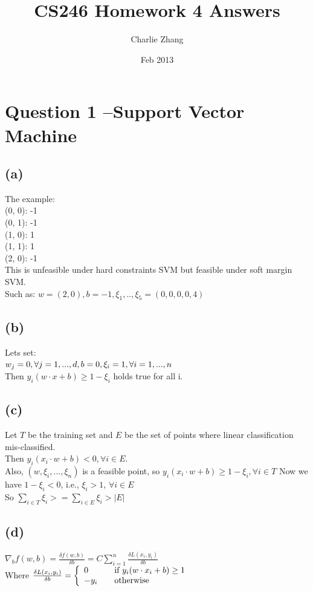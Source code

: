 \documentclass{article}
\title{CS246 Homework 4 Answers}
\author{Charlie Zhang}
\date{Feb 2013}
\begin{document}
\maketitle
\section{Question 1 --Support Vector Machine}


\subsection{(a)}
The example:\\
(0, 0): -1 \\
(0, 1): -1 \\
(1, 0): 1 \\
(1, 1): 1 \\
(2, 0): -1 \\
This is unfeasible under hard constraints SVM but feasible under soft margin SVM. \\
Such as: $w = (2, 0), b = -1, \xi_1, .., \xi_5 = (0, 0, 0, 0, 4)$

\subsection{(b)}
Lets set: \\
$w_j = 0, \forall j = 1, ..., d, \\
 b = 0, \\
 \xi_i =  1, \forall i = 1, ..., n$ \\
 Then $y_i(w\cdot x + b) \ge 1 - \xi_i$ holds true for all i.

\subsection{(c)}
Let $T$ be the training set and $E$ be the set of points where linear classification mis-classified. \\
Then $y_i(x_i\cdot w + b) < 0, \forall i \in E$. \\
Also, $(w, \xi_i, ..., \xi_n)$ is a feasible point, so $y_i(x_i\cdot w + b) \ge 1 - \xi_i, \forall i \in T$
Now we have $1 - \xi_i < 0$, i.e., $\xi_i > 1$, $\forall i \in E$\\
So $\sum\limits_{i\in T}\xi_i >= \sum\limits_{i\in E}\xi_i > |E|$\\

\subsection{(d)}
$\nabla_b  f(w, b) = \frac{\delta f(w, b)}{\delta b} = C\sum\limits_{i=1}^{n}\frac{\delta L(x_i, y_i)}{\delta b}$ \\
Where $\frac{\delta L(x_i, y_i)}{\delta b} = \left\{ 
  \begin{array}{l l}
    0 & \quad \text{if $y_i(w\cdot x_i+b)\ge 1$}\\
    -y_i & \quad \text{otherwise}
  \end{array} \right. $
\end{document}
